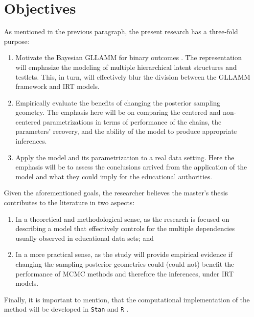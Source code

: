 \section{Objectives}

As mentioned in the previous paragraph, the present research has a three-fold purpose:

\begin{enumerate}
	\item Motivate the Bayesian GLLAMM for binary outcomes \cite{Rabe_et_al_2004a, Rabe_et_al_2004b, Skrondal_et_al_2004a, Rabe_et_al_2012}. The representation will emphasize the modeling of multiple hierarchical latent structures and testlets. This, in turn, will effectively blur the division between the GLLAMM framework and IRT models.
	
	\item Empirically evaluate the benefits of changing the posterior sampling geometry. The emphasis here will be on comparing the centered and non-centered parametrizations \cite{Gelfand_et_al_1995, Gelfand_et_al_1996} in terms of performance of the chains, the parameters' recovery, and the ability of the model to produce appropriate inferences.
	
	\item Apply the model and its parametrization to a real data setting. Here the emphasis will be to assess the conclusions arrived from the application of the model and what they could imply for the educational authorities.
\end{enumerate}

\noindent Given the aforementioned goals, the researcher believes the master's thesis contributes to the literature in two aspects: 

\begin{enumerate}
	\item In a theoretical and methodological sense, as the research is focused on describing a model that effectively controls for the multiple dependencies usually observed in educational data sets; and 
	
	\item In a more practical sense, as the study will provide empirical evidence if changing the sampling posterior geometries could (could not) benefit the performance of MCMC methods and therefore the inferences, under IRT models.
\end{enumerate}

\noindent Finally, it is important to mention, that the computational implementation of the method will be developed in \texttt{Stan} \cite{Stan2020} and \texttt{R} \cite{R2015, RStan2020}.

